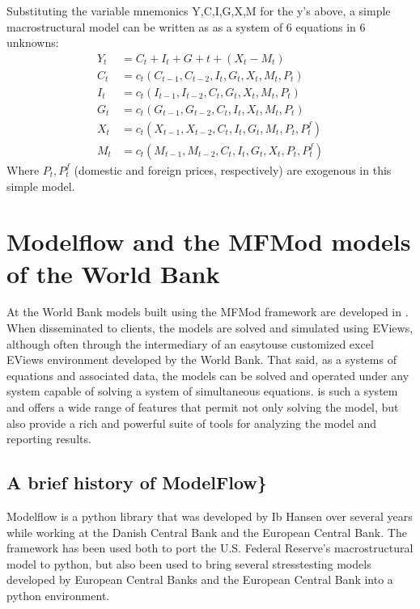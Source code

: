 \documentclass[letterpaper,10pt,english]{jupyterBook}
\begin{document}
\sphinxAtStartPar
Substituting the variable mnemonics Y,C,I,G,X,M for the y’s above, a simple macrostructural model can be written as as a system of 6 equations in 6 unknowns:
\begin{align*}
Y_t  &=  C_t+I_t+G+t+ (X_t-M_t) \\
C_t &= c_t(C_{t-1},C_{t-2},I_t,G_t,X_t,M_t,P_t)\\
I_t &= c_t(I_{t-1},I_{t-2},C_t,G_t,X_t,M_t,P_t)\\
G_t &= c_t(G_{t-1},G_{t-2},C_t,I_t,X_t,M_t,P_t)\\
X_t &= c_t(X_{t-1},X_{t-2},C_t,I_t,G_t,M_t,P_t,P^f_t)\\
M_t &= c_t(M_{t-1},M_{t-2},C_t,I_t,G_t,X_t,P_t,P^f_t)
\end{align*}
\sphinxAtStartPar
Where \(P_t, P^f_t\) (domestic and foreign prices, respectively) are exogenous in this simple model.

\sphinxstepscope


\chapter{Modelflow and the MFMod models of the World Bank}
\label{\detokenize{content/02_MacrostructuralModels/MFModAndModelFlow:modelflow-and-the-mfmod-models-of-the-world-bank}}\label{\detokenize{content/02_MacrostructuralModels/MFModAndModelFlow::doc}}
\sphinxAtStartPar
At the World Bank models built using the MFMod framework are developed in . When disseminated to clients, the models are solved and simulated using EViews, although often through the intermediary of an easy\sphinxhyphen{}to\sphinxhyphen{}use customized excel EViews environment developed by the World Bank. That said, as a systems of equations and associated data, the models can be solved and operated under any system capable of solving a system of simultaneous equations.  is such a system and offers a wide range of features that permit not only solving the model, but also provide a rich and powerful suite of tools for analyzing the model and reporting results.


\section{A brief history of ModelFlow\}}
\label{\detokenize{content/02_MacrostructuralModels/MFModAndModelFlow:a-brief-history-of-modelflow}}
\sphinxAtStartPar
Modelflow is a python library that was developed by Ib Hansen over several years while working at the Danish Central Bank and the European Central Bank. The framework has been used both to port the U.S. Federal Reserve’s macro\sphinxhyphen{}structural  model to python, but also been used to bring several stress\sphinxhyphen{}testing models developed by European Central Banks and the European Central Bank into a python environment.
\end{document}
